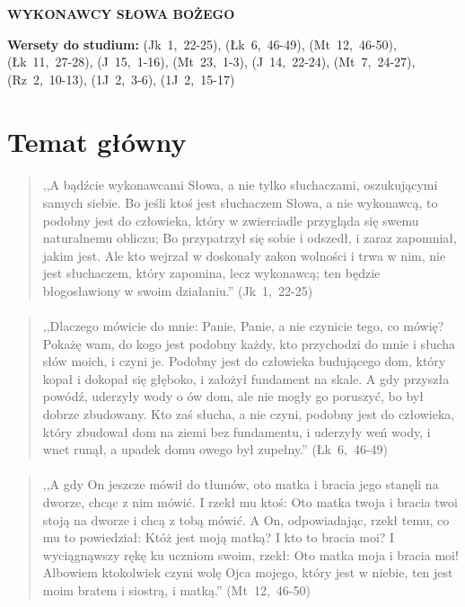 \documentclass[10pt,a4paper,oneside]{article}
\begin{document}
\centerline{\textbf{\MakeUppercase{Wykonawcy Słowa Bożego}}}
\begin{center}
\textbf{Wersety do studium:} \mbox{(Jk 1, 22-25)}, \mbox{(Łk 6, 46-49)}, \mbox{(Mt 12, 46-50)}, \mbox{(Łk 11, 27-28)}, \mbox{(J 15, 1-16)}, \mbox{(Mt 23, 1-3)}, \mbox{(J 14, 22-24)}, \mbox{(Mt 7, 24-27)}, \mbox{(Rz 2, 10-13)}, \mbox{(1J 2, 3-6)}, \mbox{(1J 2, 15-17)}
\end{center}
\section{Temat główny}
\paragraph{}
\begin{quote}
,,A bądźcie wykonawcami Słowa, a nie tylko słuchaczami, oszukującymi samych siebie. Bo jeśli ktoś jest słuchaczem Słowa, a nie wykonawcą, to podobny jest do człowieka, który w zwierciadle przygląda się swemu naturalnemu obliczu; Bo przypatrzył się sobie i odszedł, i zaraz zapomniał, jakim jest. Ale kto wejrzał w doskonały zakon wolności i trwa w nim, nie jest słuchaczem, który zapomina, lecz wykonawcą; ten będzie błogosławiony w swoim działaniu.'' \mbox{(Jk 1, 22-25)}
\end{quote}
\paragraph{}
\begin{quote}
,,Dlaczego mówicie do mnie: Panie, Panie, a nie czynicie tego, co mówię? Pokażę wam, do kogo jest podobny każdy, kto przychodzi do mnie i słucha słów moich, i czyni je. Podobny jest do człowieka budującego dom, który kopał i dokopał się głęboko, i założył fundament na skale. A gdy przyszła powódź, uderzyły wody o ów dom, ale nie mogły go poruszyć, bo był dobrze zbudowany. Kto zaś słucha, a nie czyni, podobny jest do człowieka, który zbudował dom na ziemi bez fundamentu, i uderzyły weń wody, i wnet runął, a upadek domu owego był zupełny.'' \mbox{(Łk 6, 46-49)}
\end{quote}
\paragraph{}
\begin{quote}
,,A gdy On jeszcze mówił do tłumów, oto matka i bracia jego stanęli na dworze, chcąc z nim mówić. I rzekł mu ktoś: Oto matka twoja i bracia twoi stoją na dworze i chcą z tobą mówić. A On, odpowiadając, rzekł temu, co mu to powiedział: Któż jest moją matką? I kto to bracia moi? I wyciągnąwszy rękę ku uczniom swoim, rzekł: Oto matka moja i bracia moi! Albowiem ktokolwiek czyni wolę Ojca mojego, który jest w niebie, ten jest moim bratem i siostrą, i matką.'' \mbox{(Mt 12, 46-50)}
\end{quote}
\end{document}
